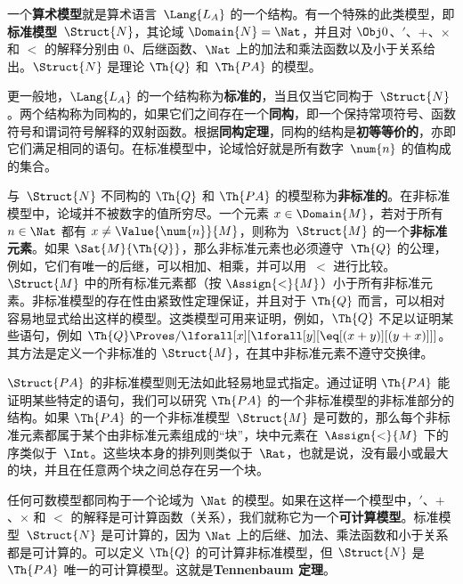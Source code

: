 一个\textbf{算术模型}就是算术语言~$\Lang{L_A}$ 的一个结构。有一个特殊的此类模型，即\textbf{标准模型}~$\Struct{N}$，其论域 $\Domain{N}
= \Nat$，并且对 $\Obj 0$、$\prime$、$+$、$\times$ 和 $<$ 的解释分别由 $0$、后继函数、$\Nat$ 上的加法和乘法函数以及小于关系给出。$\Struct{N}$ 是理论 $\Th{Q}$ 和~$\Th{PA}$ 的模型。

更一般地，$\Lang{L_A}$ 的一个结构称为\textbf{标准的}，当且仅当它同构于~$\Struct{N}$。两个结构称为同构的，如果它们之间存在一个\textbf{同构}，即一个保持常项符号、函数符号和谓词符号解释的双射函数。根据\textbf{同构定理}，同构的结构是\textbf{初等等价的}，亦即它们满足相同的语句。在标准模型中，论域恰好就是所有数字~$\num{n}$ 的值构成的集合。

与~$\Struct{N}$ 不同构的 $\Th{Q}$ 和 $\Th{PA}$ 的模型称为\textbf{非标准的}。在非标准模型中，论域并不被数字的值所穷尽。一个元素 $x \in \Domain{M}$，若对于所有~$n \in \Nat$ 都有 $x \neq \Value{\num{n}}{M}$，则称为~$\Struct{M}$ 的一个\textbf{非标准元素}。如果 $\Sat{M}{\Th{Q}}$，那么非标准元素也必须遵守~$\Th{Q}$ 的公理，例如，它们有唯一的后继，可以相加、相乘，并可以用~$<$ 进行比较。$\Struct{M}$ 中的所有标准元素都（按 $\Assign{<}{M}$）小于所有非标准元素。非标准模型的存在性由紧致性定理保证，并且对于 $\Th{Q}$ 而言，可以相对容易地显式给出这样的模型。这类模型可用来证明，例如，$\Th{Q}$ 不足以证明某些语句，例如 $\Th{Q} \Proves/ \lforall[x][\lforall[y][\eq[(x+y)][(y+x)]]]$。其方法是定义一个非标准的 $\Struct{M}$，在其中非标准元素不遵守交换律。

$\Struct{PA}$ 的非标准模型则无法如此轻易地显式指定。通过证明 $\Th{PA}$ 能证明某些特定的语句，我们可以研究 $\Th{PA}$ 的一个非标准模型的非标准部分的结构。如果 $\Th{PA}$ 的一个非标准模型~$\Struct{M}$ 是可数的，那么每个非标准元素都属于某个由非标准元素组成的“块”，块中元素在~$\Assign{<}{M}$ 下的序类似于~$\Int$。这些块本身的排列则类似于~$\Rat$，也就是说，没有最小或最大的块，并且在任意两个块之间总存在另一个块。

任何可数模型都同构于一个论域为~$\Nat$ 的模型。如果在这样一个模型中，$\prime$、$+$、$\times$ 和 $<$ 的解释是可计算函数（关系），我们就称它为一个\textbf{可计算模型}。标准模型~$\Struct{N}$ 是可计算的，因为 $\Nat$ 上的后继、加法、乘法函数和小于关系都是可计算的。可以定义 $\Th{Q}$ 的可计算非标准模型，但 $\Struct{N}$ 是 $\Th{PA}$ 唯一的可计算模型。这就是\textbf{Tennenbaum 定理}。